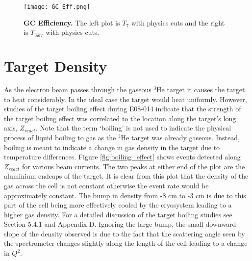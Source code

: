 \begin{figure}[!ht]
\begin{center}
\texttt{[image: GC\_Eff.png]}
\end{center}
\caption[GC Efficiency]{
{\bf{GC Efficiency.}} The left plot is $T_7$ with physics cuts and the right is $T_{3\&7}$ with physics cuts.}
\label{fig:gc_eff}
\end{figure}

\section{Target Density}
\label{sec:density}

As the electron beam passes through the gaseous $^3$He target it causes the target to heat considerably. In the ideal case the target would heat uniformly. However, studies of the target boiling effect during E08-014 indicate that the strength of the target boiling effect was correlated to the location along the target's long axis, $Z_{react}$. Note that the term `boiling' is not used to indicate the physical process of liquid boiling to gas as the $^3$He target was already gaseous. Instead, boiling is meant to indicate a change in gas density in the target due to temperature differences. Figure \ref{fig:boiling_effect} shows events detected along $Z_{react}$ for various beam currents. The two peaks at either end of the plot are the aluminium endcaps of the target. It is clear from this plot that the density of the gas across the cell is not constant otherwise the event rate would be approximately constant. The bump in density from -8 cm to -3 cm is due to this part of the cell being more effectively cooled by the cryosystem leading to a higher gas density. For a detailed discussion of the target boiling studies see \cite{Thesis:Ye} Section 5.4.1 and Appendix D. Ignoring the large bump, the small downward slope of the density observed is due to the fact that the scattering angle seen by the spectrometer changes slightly along the length of the cell leading to a change in $Q^2$.  


